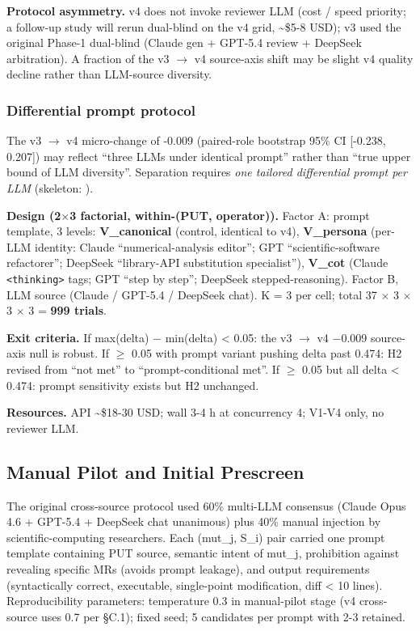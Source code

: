 \documentclass[manuscript,screen,review]{acmart}
\begin{document}
\textbf{Protocol asymmetry.} v4 does not invoke reviewer LLM (cost
/ speed priority; a follow-up study will rerun dual-blind on the v4
grid, \textasciitilde\$5-8 USD); v3 used the original Phase-1 dual-blind
(Claude gen + GPT-5.4 review + DeepSeek arbitration). A fraction of the
v3 $\to$ v4 source-axis shift may be slight v4 quality decline rather than
LLM-source diversity.

\subsubsection{Differential prompt protocol}\label{c.1.1-differential-prompt-protocol-future-work-commitment}

The v3 $\to$ v4 micro-change of -0.009 (paired-role bootstrap 95\% CI
[-0.238, 0.207]) may reflect ``three LLMs under
identical prompt'' rather than ``true upper bound of LLM diversity''.
Separation requires \emph{one tailored differential prompt per LLM}
(skeleton: ).

\textbf{Design (2$\times$3 factorial, within-(PUT, operator)).} Factor A:
prompt template, 3 levels: \textbf{V\_canonical} (control, identical to
v4), \textbf{V\_persona} (per-LLM identity: Claude ``numerical-analysis
editor''; GPT ``scientific-software refactorer''; DeepSeek ``library-API
substitution specialist''), \textbf{V\_cot} (Claude
\texttt{\textless{}thinking\textgreater{}} tags; GPT ``step by step'';
DeepSeek stepped-reasoning). Factor B, LLM source (Claude / GPT-5.4 /
DeepSeek chat). K = 3 per cell; total 37 $\times$ 3 $\times$ 3 $\times$ 3 = \textbf{999
trials}.

\textbf{Exit criteria.} If max(delta) $-$ min(delta) \textless{} 0.05: the
v3 $\to$ v4 $-$0.009 source-axis null is robust. If $\geq$ 0.05 with prompt variant
pushing delta past 0.474: H2 revised from ``not met'' to
``prompt-conditional met''. If $\geq$ 0.05 but all delta \textless{} 0.474:
prompt sensitivity exists but H2 unchanged.

\textbf{Resources.} API \textasciitilde\$18-30 USD; wall 3-4 h at
concurrency 4; V1-V4 only, no reviewer LLM.

\subsection{Manual Pilot and Initial Prescreen}\label{c.2-manual-pilot-lineage-llm-client-configuration-and-l0-prescreen}

The original cross-source protocol used 60\% multi-LLM consensus (Claude Opus
4.6 + GPT-5.4 + DeepSeek chat unanimous) plus 40\% manual injection by
scientific-computing researchers. Each (mut\_j, S\_i) pair carried one
prompt template containing PUT source, semantic intent of mut\_j,
prohibition against revealing specific MRs (avoids prompt leakage), and
output requirements (syntactically correct, executable, single-point
modification, diff \textless{} 10 lines). Reproducibility parameters:
temperature 0.3 in manual-pilot stage (v4 cross-source uses 0.7 per
§C.1); fixed seed; 5 candidates per prompt with 2-3 retained.
\end{document}
